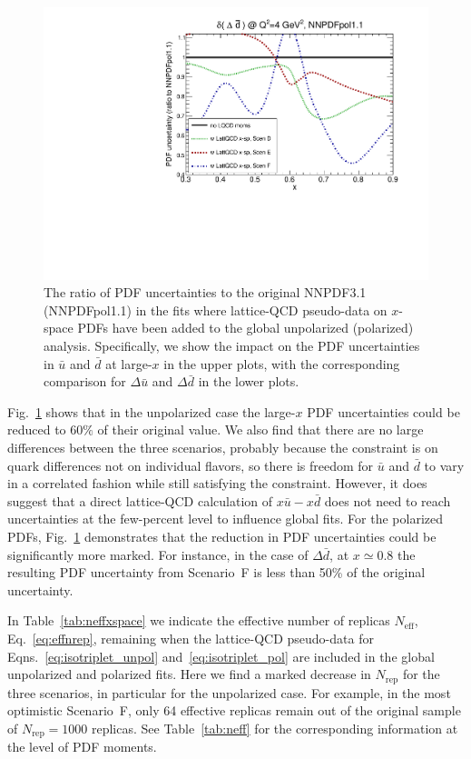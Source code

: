 \begin{figure}[!t]
\includegraphics[scale=0.45]{plots/xdbar-pol-lattice-relerr-xdata-xspace.pdf}
\caption{\small The ratio of PDF uncertainties to the original
  NNPDF3.1 (NNPDFpol1.1) in the fits where lattice-QCD pseudo-data
  on $x$-space PDFs have been added to the global unpolarized
  (polarized) analysis.
  Specifically, we show the impact on the PDF uncertainties
  in $\bar{u}$ and $\bar{d}$ at large-$x$ in the upper
  plots, with the corresponding comparison for $\Delta\bar{u}$
  and $\Delta\bar{d}$ in the lower plots.
}    
\label{fig:impactxspace}
\end{figure}

Fig.~\ref{fig:impactxspace} shows that
in the unpolarized case the large-$x$ PDF uncertainties could be reduced
to $60\%$ of their original value.
%
We also find that there are no large
differences between the three
scenarios,
probably because the constraint is on quark differences not on individual 
flavors, so there is freedom for $\bar u$ and $\bar d$ to vary in a correlated 
fashion while still satisfying the constraint. 
%
However, it does suggest 
that a direct lattice-QCD calculation
of $x \bar{u}-x \bar{d}$ does not need to reach uncertainties
at the few-percent level to influence global fits.
%
For the polarized PDFs, Fig.~\ref{fig:impactxspace} demonstrates that the
reduction in PDF uncertainties could be significantly more marked.
%
For instance, in the case of $\Delta \bar{d}$, at $x\simeq 0.8$
the resulting PDF uncertainty from Scenario~F is less than 50\%
of the original uncertainty.

In Table~\ref{tab:neffxspace} we indicate the effective number of replicas
$N_\text{eff}$, Eq.~\eqref{eq:effnrep}, remaining when
the lattice-QCD pseudo-data for Eqns.~\eqref{eq:isotriplet_unpol}
and~\eqref{eq:isotriplet_pol} are included in the global
unpolarized and polarized fits.
%
Here we find a marked decrease in $N_\text{rep}$
for the three scenarios,
in particular for the unpolarized case.
%
For example, in the most optimistic Scenario~F, only
64 effective replicas remain out of the
original sample of $N_\text{rep}=1000$ replicas.
%
See Table~\ref{tab:neff} for the corresponding
information at the level of PDF moments.
   
